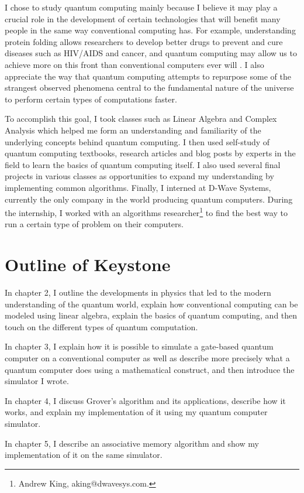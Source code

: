 \documentclass[11pt]{report}
\newcommand{\?}{\stackrel{?}{=}}
\begin{document}
I chose to study quantum computing mainly because I believe it may play a crucial role in the development of certain technologies that will benefit many people in the same way conventional computing has. For example, understanding protein folding allows researchers to develop better drugs to prevent and cure diseases such as HIV/AIDS and cancer, and quantum computing may allow us to achieve more on this front than conventional computers ever will \cite{foldit}. I also appreciate the way that quantum computing attempts to repurpose some of the strangest observed phenomena central to the fundamental nature of the universe to perform certain types of computations faster. 

To accomplish this goal, I took classes such as Linear Algebra and Complex Analysis which helped me form an understanding and familiarity of the underlying concepts behind quantum computing. I then used self-study of quantum computing textbooks, research articles and blog posts by experts in the field to learn the basics of quantum computing itself. I also used several final projects in various classes as opportunities to expand my understanding by implementing common algorithms. Finally, I interned at D-Wave Systems, currently the only company in the world producing quantum computers. During the internship, I worked with an algorithms researcher\footnote{Andrew King, aking@dwavesys.com.} to find the best way to run a certain type of problem on their computers.

\section{Outline of Keystone}
In chapter 2, I outline the developments in physics that led to the modern understanding of the quantum world, explain how conventional computing can be modeled using linear algebra, explain the basics of quantum computing, and then touch on the different types of quantum computation.

In chapter 3, I explain how it is possible to simulate a gate-based quantum computer on a conventional computer as well as describe more precisely what a quantum computer does using a mathematical construct, and then introduce the simulator I wrote.

In chapter 4, I discuss Grover's algorithm and its applications, describe how it works, and explain my implementation of it using my quantum computer simulator.

In chapter 5, I describe an associative memory algorithm and show my implementation of it on the same simulator.
\end{document}
